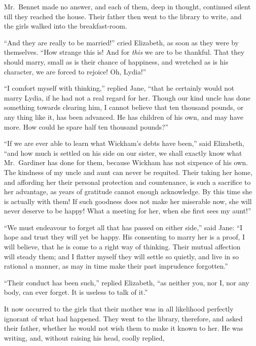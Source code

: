 Mr.\ Bennet made no answer, and each of them, deep
in thought, continued silent till they reached the house.
Their father then went to the library to write, and the
girls walked into the breakfast-room.

“And they are really to be married!” cried Elizabeth,
as soon as they were by themselves. “How strange this
is! And for \textit{this} we are to be thankful. That they should
marry, small as is their chance of happiness, and wretched
as is his character, we are forced to rejoice! Oh, Lydia!”

“I comfort myself with thinking,” replied Jane, “that
he certainly would not marry Lydia, if he had not a real
regard for her. Though our kind uncle has done something
towards clearing him, I cannot believe that ten thousand
pounds, or any thing like it, has been advanced. He has
children of his own, and may have more. How could he
spare half ten thousand pounds?”

“If we are ever able to learn what Wickham’s debts
have been,” said Elizabeth, “and how much is settled on his
side on our sister, we shall exactly know what Mr.\ Gardiner
has done for them, because Wickham has not sixpence
of his own. The kindness of my uncle and aunt can never
be requited. Their taking her home, and affording her
their personal protection and countenance, is such a
sacrifice to her advantage, as years of gratitude cannot
enough acknowledge. By this time she is actually with
them! If such goodness does not make her miserable
now, she will never deserve to be happy! What a meeting
for her, when she first sees my aunt!”

“We must endeavour to forget all that has passed on
either side,” said Jane: “I hope and trust they will yet
be happy. His consenting to marry her is a proof, I will
believe, that he is come to a right way of thinking. Their
mutual affection will steady them; and I flatter myself
they will settle so quietly, and live in so rational a manner,
as may in time make their past imprudence forgotten.”

“Their conduct has been such,” replied Elizabeth, “as
neither you, nor I, nor any body, can ever forget. It is
useless to talk of it.”

It now occurred to the girls that their mother was in
all likelihood perfectly ignorant of what had happened.
They went to the library, therefore, and asked their father,
whether he would not wish them to make it known to
her. He was writing, and, without raising his head, coolly
replied,

